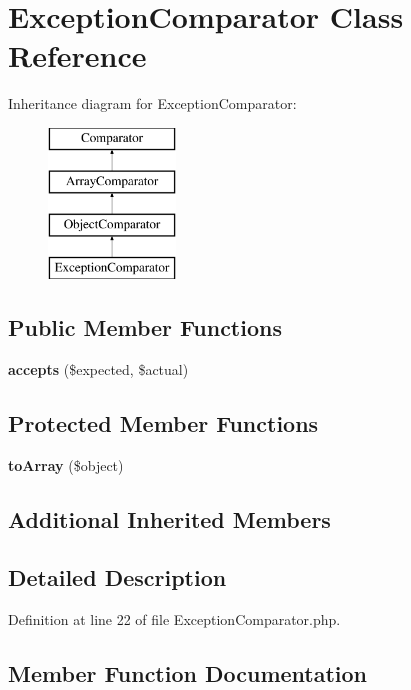 \section{Exception\+Comparator Class Reference}
\label{class_sebastian_bergmann_1_1_comparator_1_1_exception_comparator}
Inheritance diagram for Exception\+Comparator\+:\begin{figure}[H]
\begin{center}
\leavevmode
\includegraphics[height=4.000000cm]{class_sebastian_bergmann_1_1_comparator_1_1_exception_comparator}
\end{center}
\end{figure}
\subsection*{Public Member Functions}
\begin{DoxyCompactItemize}
\item 
{\bf accepts} (\$expected, \$actual)
\end{DoxyCompactItemize}
\subsection*{Protected Member Functions}
\begin{DoxyCompactItemize}
\item 
{\bf to\+Array} (\$object)
\end{DoxyCompactItemize}
\subsection*{Additional Inherited Members}


\subsection{Detailed Description}


Definition at line 22 of file Exception\+Comparator.\+php.



\subsection{Member Function Documentation}
